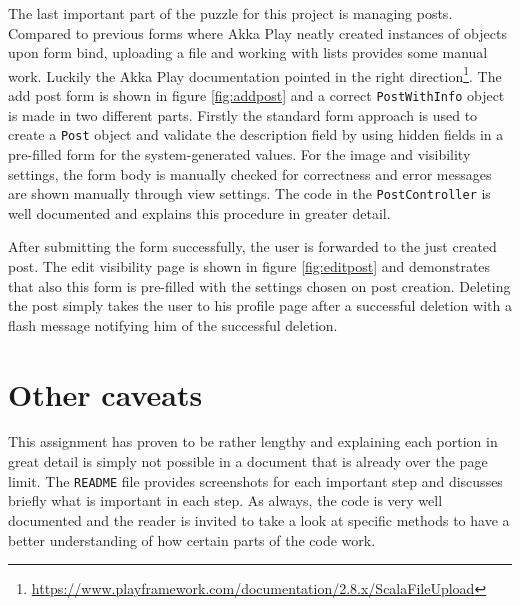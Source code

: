 The last important part of the puzzle for this project is managing posts.
Compared to previous forms where Akka Play neatly created instances of objects upon form bind, uploading a file and working with lists provides some manual work.
Luckily the Akka Play documentation pointed in the right direction\footnote{\url{https://www.playframework.com/documentation/2.8.x/ScalaFileUpload}}.
The add post form is shown in figure \ref{fig:addpost} and a correct \texttt{PostWithInfo} object is made in two different parts.
Firstly the standard form approach is used to create a \texttt{Post} object and validate the description field by using hidden fields in a pre-filled form for the system-generated values.
For the image and visibility settings, the form body is manually checked for correctness and error messages are shown manually through view settings.
The code in the \texttt{PostController} is well documented and explains this procedure in greater detail.

After submitting the form successfully, the user is forwarded to the just created post.
The edit visibility page is shown in figure \ref{fig:editpost} and demonstrates that also this form is pre-filled with the settings chosen on post creation.
Deleting the post simply takes the user to his profile page after a successful deletion with a flash message notifying him of the successful deletion.





\section{Other caveats}
\label{sec:caveats}

This assignment has proven to be rather lengthy and explaining each portion in great detail is simply not possible in a document that is already over the page limit.
The \texttt{README} file provides screenshots for each important step and discusses briefly what is important in each step.
As always, the code is very well documented and the reader is invited to take a look at specific methods to have a better understanding of how certain parts of the code work.